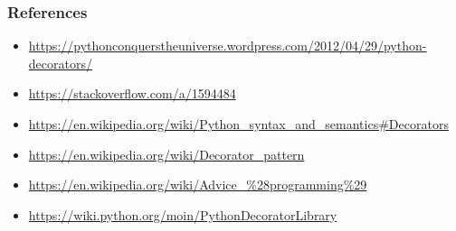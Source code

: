 \documentclass{beamer}
\begin{document}
\begin{frame}
\frametitle{References}
\begin{small}
\begin{itemize}
  \item{\url{https://pythonconquerstheuniverse.wordpress.com/2012/04/29/python-decorators/}}
  \item{\url{https://stackoverflow.com/a/1594484}}
  \item{\url{https://en.wikipedia.org/wiki/Python_syntax_and_semantics\#Decorators}}
  \item{\url{https://en.wikipedia.org/wiki/Decorator_pattern}}
  \item{\url{https://en.wikipedia.org/wiki/Advice_\%28programming\%29}}
  \item{\url{https://wiki.python.org/moin/PythonDecoratorLibrary}}
\end{itemize}
\end{small}
\end{frame}
\end{document}
